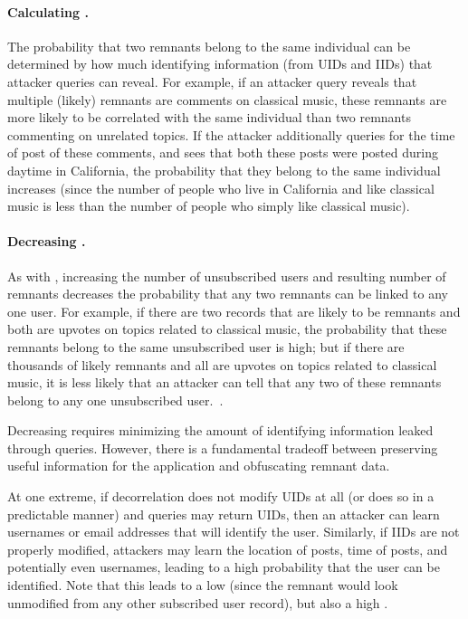 \paragraph{Calculating \plinked{}.}
The probability that two remnants belong to the same individual can be determined by how much
identifying information (from UIDs and IIDs) that attacker queries can reveal.
For example, if an attacker query reveals that multiple
(likely) remnants are comments on classical music, these remnants are more likely to be
correlated with the same individual than two remnants commenting on unrelated topics. If the
attacker additionally queries for the time of post of these comments, and sees that both these posts
were posted during daytime in California, the probability that they belong to the same individual
increases (since the number of people who live in California and like classical music is less than
the number of people who simply like classical music).

\paragraph{Decreasing \plinked{}.}
As with \premnant{}, increasing the number of unsubscribed users and resulting
number of remnants decreases the probability that any two remnants can be linked to any one
user. For example, if there are two records that are likely to be remnants and both are upvotes on topics related to
classical music, the probability that these remnants belong to the same unsubscribed user is high; but if
there are thousands of likely remnants and all are upvotes on topics related to classical music, it
is less likely that an attacker can tell that any two of these remnants belong to any one
unsubscribed user.~.

Decreasing \plinked{} requires minimizing the amount of identifying information leaked
through queries. However, there is a fundamental tradeoff between preserving useful information for
the application and obfuscating remnant data. 

At one extreme, if decorrelation does not modify UIDs at all (or does so in a predictable manner)
and queries may return UIDs, then an attacker can learn usernames or email addresses that will
identify the user. Similarly, if IIDs are not properly modified, attackers may learn
the location of posts, time of posts, and potentially even usernames, leading to a high probability
that the user can be identified.  Note that this leads to a low \premnant{} (since the
remnant would look unmodified from any other subscribed user record), but also a high \plinked{}.

